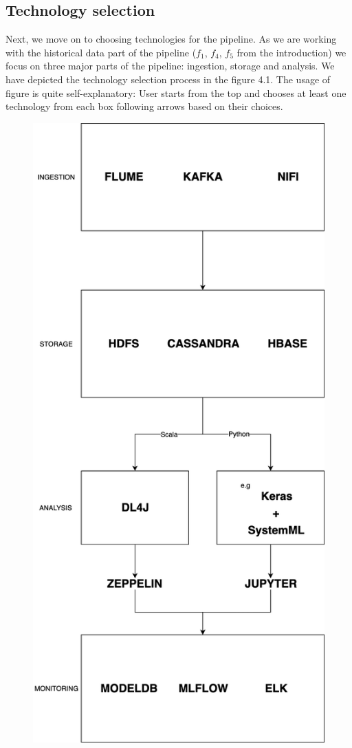 \subsection{Technology selection}

Next, we move on to choosing technologies for the pipeline.
As we are working with the historical data part of the pipeline ($f_1$, $f_4$, $f_5$ from the introduction) we focus on three major parts of the pipeline: ingestion, storage and analysis.
We have depicted the technology selection process in the figure 4.1.
The usage of figure is quite self-explanatory:
User starts from the top and chooses at least one technology from each box following arrows based on their choices.

\begin{figure}[ht!]
    \includegraphics[scale=0.33]{images/select_flow} 

\end{figure}
